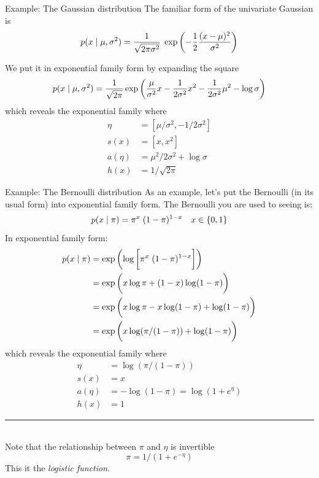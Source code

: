 \documentclass[10pt]{beamer}
\begin{document}
\begin{frame}{Example: The Gaussian distribution}
\footnotesize
The familiar form of the univariate Gaussian is 
\[ p(x \; | \; \mu, \sigma^2) = \displaystyle\frac{1}{\sqrt{2 \pi \sigma^2}} \; \exp \bigg( { - \displaystyle\frac{1}{2} \displaystyle\frac{(x-\mu)^2}{\sigma^2}} \bigg)  \] 
\pause

We put it in exponential family form by expanding the square
\begin{align*}
 p(x \; | \; \mu, \sigma^2) = \displaystyle\frac{1}{\sqrt{2 \pi}} \exp \bigg( { \displaystyle\frac{\mu}{\sigma^2} x - \displaystyle\frac{1}{2 \sigma^2} x^2 - \displaystyle\frac{1}{2 \sigma^2} \mu^2 - \log \sigma} \bigg)
 \end{align*}
 which reveals the exponential family where
 \begin{align*}
\eta &= [\mu/\sigma^2, -1/2 \sigma^2 ]\\
s(x) &= [x, x^2] \\
a(\eta) &= \mu^2/2\sigma^2 + \log \sigma \\
h(x) &=  1/\sqrt{2 \pi}
 \end{align*}

\end{frame}


\begin{frame}{Example: The Bernoulli distribution}
\footnotesize
As an example, let's put the Bernoulli (in its usual form) into exponential family form.   The Bernoulli you are used to seeing is:
\[ p(x \; | \; \pi) = \pi^x \; (1-\pi)^{1-x} \quad x \in \{ {0,1} \} \] 
\pause
In exponential family form:
\begin{align*}
 p(x \; | \; \pi) &= \exp \bigg( {  \log \bigg[ {\pi^x \; (1-\pi)^{1-x} } \bigg]} \bigg) \\
 &= \exp \bigg( { x \log \pi + (1-x) \log (1-\pi)} \bigg) \\
 &= \exp \bigg( {x \log \pi - x \log (1-\pi) + \log (1-\pi)} \bigg) \\
&= \exp \bigg( {x \log (\pi/(1-\pi)) + \log (1-\pi) } \bigg) 
 \end{align*}
 which reveals the exponential family where
 \begin{align*}
\eta &= \log(\pi / (1-\pi) ) \\
s(x) &= x\\
a(\eta) &= -\log (1-\pi) = \log (1 + e^\eta) \\
h(x) &=  1
 \end{align*}
\noindent\rule{2cm}{.4pt} \\
\tiny  Note that the relationship between $\pi$ and $\eta$ is invertible
\[ \pi = 1/(1 + e^{-\eta})\] 
 This it the \it{logistic function}.


\end{frame}
\end{document}
